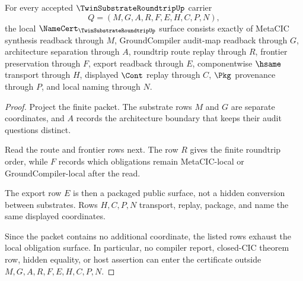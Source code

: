 \begin{theorem}
\label{thm:twin-substrate-roundtrip-obligation-surface}
For every accepted $\TwinSubstrateRoundtripUp$ carrier
$$
Q=(M,G,A,R,F,E,H,C,P,N),
$$
the local $\NameCert_{\TwinSubstrateRoundtripUp}$ surface consists exactly of MetaCIC synthesis readback through $M$, GroundCompiler audit-map readback through $G$, architecture separation through $A$, roundtrip route replay through $R$, frontier preservation through $F$, export readback through $E$, componentwise $\hsame$ transport through $H$, displayed $\Cont$ replay through $C$, $\Pkg$ provenance through $P$, and local naming through $N$.
\end{theorem}
\begin{proof}
Project the finite packet. The substrate rows $M$ and $G$ are separate coordinates, and $A$ records the architecture boundary that keeps their audit questions distinct.

Read the route and frontier rows next. The row $R$ gives the finite roundtrip order, while $F$ records which obligations remain MetaCIC-local or GroundCompiler-local after the read.

The export row $E$ is then a packaged public surface, not a hidden conversion between substrates. Rows $H,C,P,N$ transport, replay, package, and name the same displayed coordinates.

Since the packet contains no additional coordinate, the listed rows exhaust the local obligation surface. In particular, no compiler report, closed-CIC theorem row, hidden equality, or host assertion can enter the certificate outside $M,G,A,R,F,E,H,C,P,N$.
\end{proof}

